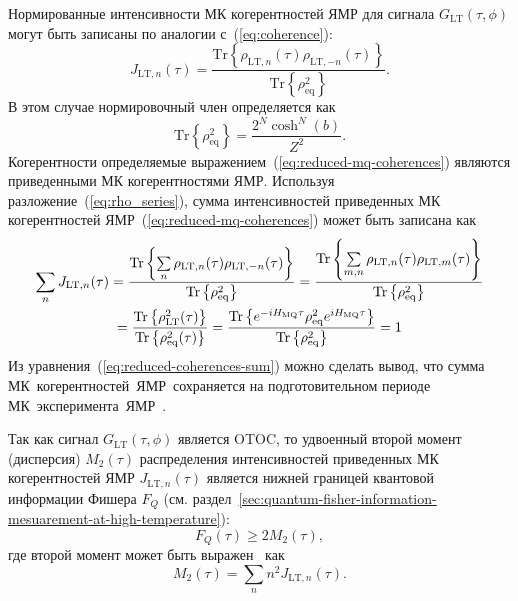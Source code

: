 Нормированные интенсивности МК когерентностей ЯМР для сигнала $G_\mathrm{LT}(\tau, \phi)$
могут быть записаны по аналогии с~(\ref{eq:coherence}):
%
\begin{equation}\label{eq:reduced-mq-coherences}
    J_{\mathrm{LT}, n}(\tau) =
    \frac{\mathrm{Tr} \left\{
        \rho_{\mathrm{LT},n}(\tau)
        \rho_{\mathrm{LT}, -n}(\tau)
    \right\}}
    {\mathrm{Tr}\left\{\rho^2_\mathrm{eq}\right\}}.
\end{equation}
%
В этом случае нормировочный член определяется как
%
\begin{equation}\label{eq:j_lt_norm}
  \mathrm{Tr}\left\{\rho^2_\mathrm{eq}\right\} =
    \frac{2^N \cosh^N(b)}{Z^2}.
\end{equation}
Когерентности определяемые выражением~(\ref{eq:reduced-mq-coherences})
являются приведенными МК когерентностями ЯМР.
%
Используя разложение~(\ref{eq:rho_series}),
сумма интенсивностей приведенных МК когерентностей ЯМР~(\ref{eq:reduced-mq-coherences}) может быть записана как
%
\begin{multline}\label{eq:reduced-coherences-sum}
  \sum\limits_{n} J_{\mathrm{LT}, n}(\tau)
  = \dfrac{
    \mathrm{Tr} \left\{ 
      \sum\limits_{n}
      \rho_{\mathrm{LT}, n}(\tau)
      \rho_{\mathrm{LT},-n}(\tau) \right\}
    }{
    \mathrm{Tr} \left\{ \rho^2_\mathrm{eq}  \right\}
  }
  = \dfrac{
    \mathrm{Tr} \left\{ 
      \sum\limits_{m,n}
      \rho_{\mathrm{LT}, n}(\tau)
      \rho_{\mathrm{LT}, m}(\tau)
     \right\}}{
    \mathrm{Tr} \left\{ \rho^2_\mathrm{eq} \right\}
  }
  \\
  = \dfrac{
    \mathrm{Tr} \left\{ \rho_\mathrm{LT}^2(\tau) \right\}
  }{
    \mathrm{Tr} \left\{ \rho^2_\mathrm{eq}(\tau) \right\}
  }
  = \dfrac{
    \mathrm{Tr} \left\{ 
      e^{-i H_\mathrm{MQ} \tau}
      \rho^{2}_\mathrm{eq}
      e^{i H_\mathrm{MQ} \tau}
     \right\}
  }{
    \mathrm{Tr} \left\{  \rho^2_\mathrm{eq} \right\}
  }
  = 1
\end{multline}
%
Из уравнения~(\ref{eq:reduced-coherences-sum}) можно сделать вывод, что сумма МК~когерентностей~ЯМР~сохраняется на подготовительном периоде МК~эксперимента~ЯМР~\cite{Baum1985}.


Так как сигнал $G_\mathrm{LT}(\tau, \phi)$ является OTOC,
то удвоенный второй момент (дисперсия) $M_2(\tau)$ распределения интенсивностей приведенных МК когерентностей ЯМР $J_{\mathrm{LT}, n} (\tau)$
является нижней границей квантовой информации Фишера $F_{Q}$
(см. раздел~\ref{sec:quantum-fisher-information-mesuarement-at-high-temperature}):
\begin{equation}\label{eq:fisher-low-bound}
  F_{Q}(\tau) \geq 2M_2(\tau),
\end{equation}
где второй момент может быть выражен~\cite{Khitrin1997} как
%
\begin{equation}\label{eq:m2-via-coherences}
  M_2(\tau) = \sum\limits_n n^2 J_{\mathrm{LT}, n} (\tau).
\end{equation}

